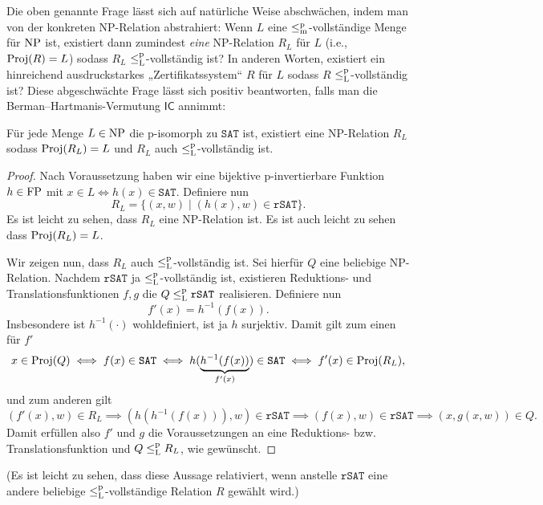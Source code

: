 Die oben genannte Frage lässt sich auf natürliche Weise abschwächen, indem man von der konkreten NP-Relation abstrahiert: Wenn $L$ eine $\leq_\mathrm{m}^\mathrm{p}$-vollständige Menge für $\mathrm{NP}$ ist, existiert dann zumindest \emph{eine} NP-Relation $R_L$ für $L$ (i.e., $\operatorname{Proj}(R)=L$) sodass $R_L$ $\leq_\mathrm{L}^\mathrm{p}$-vollständig ist? In anderen Worten, existiert ein hinreichend ausdruckstarkes „Zertifikatssystem“ $R$ für $L$ sodass $R$ $\leq_\mathrm{L}^\mathrm{p}$-vollständig ist?
Diese abgeschwächte Frage lässt sich positiv beantworten, falls man die Berman--Hartmanis-Vermutung $\mathsf{IC}$ annimmt:
\begin{observation}\label{obs:isomorphs-sind-leqlp-vollst}
    Für jede Menge $L\in \mathrm{NP}$ die p-isomorph zu $\mathtt{SAT}$ ist, existiert eine NP-Relation $R_L$ sodass $\operatorname{Proj}(R_L)=L$ und $R_L$ auch $\leq_\mathrm{L}^\mathrm{p}$-vollständig ist.
\end{observation}
\begin{proof}
    Nach Voraussetzung haben wir eine bijektive p-invertierbare Funktion $h\in\mathrm{FP}$ mit $x\in L \iff h(x) \in \mathtt{SAT}$.
    Definiere nun
    \[ R_L = \{ (x,w) \mid (h(x), w)\in \mathtt{rSAT}\}. \]
    Es ist leicht zu sehen, dass $R_L$ eine NP-Relation ist. Es ist auch leicht zu sehen dass $\operatorname{Proj}(R_L)=L$.

    Wir zeigen nun, dass $R_L$ auch $\leq_\mathrm{L}^\mathrm{p}$-vollständig ist. Sei hierfür $Q$ eine beliebige NP-Relation. Nachdem $\mathtt{rSAT}$ ja $\leq_\mathrm{L}^\mathrm{p}$-vollständig ist, existieren Reduktions- und Translationsfunktionen $f,g$ die $Q\leq_\mathrm{L}^\mathrm{p} \mathtt{rSAT}$ realisieren.
    Definiere nun
    \[ f'(x) = h^{-1}(f(x)). \]
    Insbesondere ist $h^{-1}(\cdot)$ wohldefiniert, ist ja $h$ surjektiv.
    Damit gilt zum einen für $f'$
    \[ x\in \operatorname{Proj}(Q) \iff f(x) \in \mathtt{SAT} \iff h(\underbrace{h^{-1}(f(x))}_{f'(x)}) \in \mathtt{SAT} \iff f'(x) \in \operatorname{Proj}(R_L), \]
    und zum anderen gilt
    \[ (f'(x), w) \in R_L \implies (h(h^{-1}(f(x))), w)\in \mathtt{rSAT} \implies (f(x), w)\in \mathtt{rSAT} \implies (x, g(x, w))\in Q.  \]
    Damit erfüllen also $f'$ und $g$ die Voraussetzungen an eine Reduktions- bzw. Translationsfunktion und $Q\leq_\mathrm{L}^\mathrm{p} R_L$, wie gewünscht.
\end{proof}
(Es ist leicht zu sehen, dass diese Aussage relativiert, wenn anstelle $\mathtt{rSAT}$ eine andere beliebige $\leq_\mathrm{L}^\mathrm{p}$-vollständige Relation $R$ gewählt wird.)


